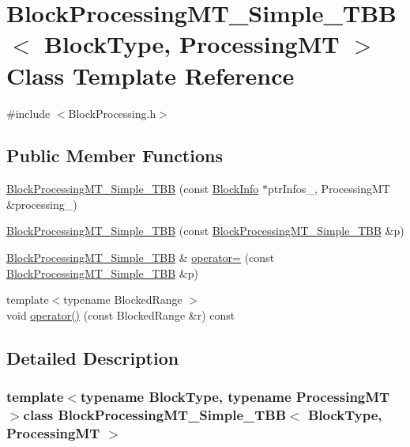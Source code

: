 \hypertarget{class_block_processing_m_t___simple___t_b_b}{}\section{Block\+Processing\+M\+T\+\_\+\+Simple\+\_\+\+T\+B\+B$<$ Block\+Type, Processing\+M\+T $>$ Class Template Reference}
\label{class_block_processing_m_t___simple___t_b_b}


{\ttfamily \#include $<$Block\+Processing.\+h$>$}

\subsection*{Public Member Functions}
\begin{DoxyCompactItemize}
\item 
\hyperlink{class_block_processing_m_t___simple___t_b_b_a691756211b9c0a9569522ebcb450027a}{Block\+Processing\+M\+T\+\_\+\+Simple\+\_\+\+T\+B\+B} (const \hyperlink{struct_block_info}{Block\+Info} $\ast$ptr\+Infos\+\_\+, Processing\+M\+T \&processing\+\_\+)
\item 
\hyperlink{class_block_processing_m_t___simple___t_b_b_ae61c509d7c1e21ab320ebd8662240aa3}{Block\+Processing\+M\+T\+\_\+\+Simple\+\_\+\+T\+B\+B} (const \hyperlink{class_block_processing_m_t___simple___t_b_b}{Block\+Processing\+M\+T\+\_\+\+Simple\+\_\+\+T\+B\+B} \&p)
\item 
\hyperlink{class_block_processing_m_t___simple___t_b_b}{Block\+Processing\+M\+T\+\_\+\+Simple\+\_\+\+T\+B\+B} \& \hyperlink{class_block_processing_m_t___simple___t_b_b_ac5597c90925243796b290b21269e9e63}{operator=} (const \hyperlink{class_block_processing_m_t___simple___t_b_b}{Block\+Processing\+M\+T\+\_\+\+Simple\+\_\+\+T\+B\+B} \&p)
\item 
{\footnotesize template$<$typename Blocked\+Range $>$ }\\void \hyperlink{class_block_processing_m_t___simple___t_b_b_a57abb7f3b784cca155c948b93b04b570}{operator()} (const Blocked\+Range \&r) const 
\end{DoxyCompactItemize}


\subsection{Detailed Description}
\subsubsection*{template$<$typename Block\+Type, typename Processing\+M\+T$>$class Block\+Processing\+M\+T\+\_\+\+Simple\+\_\+\+T\+B\+B$<$ Block\+Type, Processing\+M\+T $>$}

